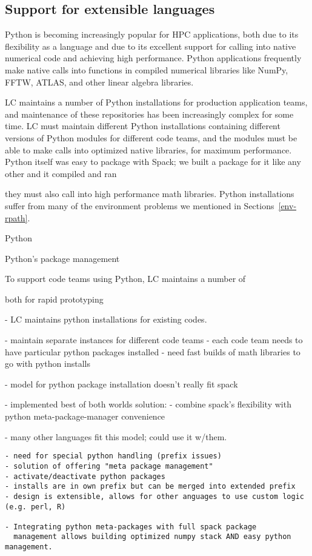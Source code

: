 
\subsection{Support for extensible languages}
\label{sec:usecase-python}

Python is becoming increasingly popular for HPC applications, 
both due to its flexibility as a language and due to its excellent support
for calling into native numerical code and achieving high performance. 
Python applications frequently make native calls into functions in
compiled numerical libraries like NumPy, FFTW, ATLAS, and other linear
algebra libraries.

LC maintains a number of Python installations for production application teams,
and maintenance of these repositories has been increasingly complex for
some time.  LC must maintain different Python installations containing different
versions of Python modules for different code teams, and the modules must be able
to make calls into optimized native libraries, for maximum performance.
Python itself was easy to package with Spack; we built a package for it like any
other and it compiled and ran


they must also call into high performance math libraries. Python installations
suffer from many of the environment problems we mentioned in Sections~\ref{env-rpath}.




Python 


 \cite{eby:setuptools}


Python's package management 


To support code teams using Python, LC maintains a number of 

both for rapid prototyping 



- LC maintains python installations for existing codes.

- maintain separate instances for different code teams
	- each code team needs to have particular python packages installed
	- need fast builds of math libraries to go with python installs

- model for python package installation doesn't really fit spack



- implemented best of both worlds solution:
	- combine spack's flexibility with python meta-package-manager convenience

	- many other languages fit this model; could use it w/them.





\begin{verbatim}
- need for special python handling (prefix issues)
- solution of offering "meta package management"
- activate/deactivate python packages
- installs are in own prefix but can be merged into extended prefix
- design is extensible, allows for other anguages to use custom logic (e.g. perl, R)

- Integrating python meta-packages with full spack package
  management allows building optimized numpy stack AND easy python management.
\end{verbatim}
